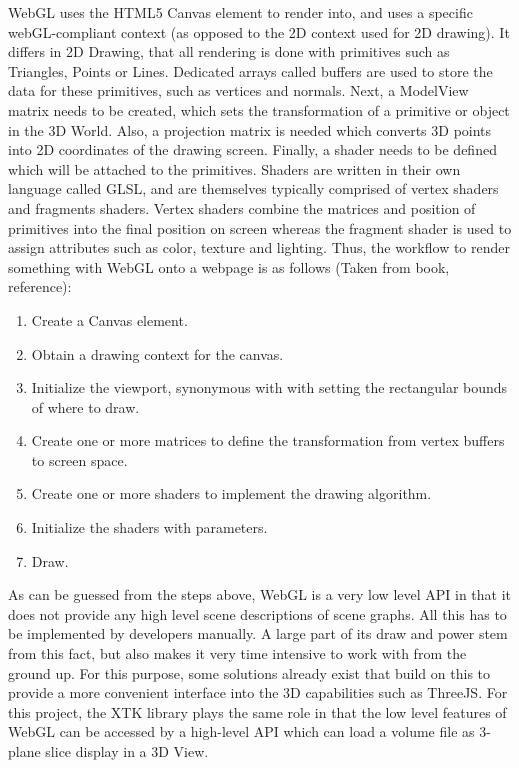 \documentclass[a4paper,11pt,twoside]{article}
\begin{document}
WebGL uses the HTML5 Canvas element to render into, and uses a specific webGL-compliant context (as opposed to the 2D context used for 2D drawing). It differs in 2D Drawing, that all rendering is done with primitives such as Triangles, Points or Lines. 
Dedicated arrays called buffers are used to store the data for these primitives, such as vertices and normals. Next, a ModelView matrix needs to be created, which sets the transformation of a primitive or object in the 3D World. Also, a projection matrix is needed which converts 3D points into 2D coordinates of the drawing screen. Finally, a shader needs to be defined which will be attached to the primitives. Shaders are written in their own language called GLSL, and are themselves typically comprised of vertex shaders and fragments shaders. Vertex shaders combine the matrices and position of primitives into the final position on screen whereas the fragment shader is used to assign attributes such as color, texture and lighting. Thus, the workflow to render something with WebGL onto a webpage is as follows (Taken from book, reference):

\begin{enumerate}
\item Create a Canvas element.
\item Obtain a drawing context for the canvas.
\item Initialize the viewport, synonymous with with setting the rectangular bounds of where to draw.
\item Create one or more matrices to define the transformation from vertex buffers to screen space.
\item Create one or more shaders to implement the drawing algorithm.
\item Initialize the shaders with parameters.
\item Draw.
\end{enumerate}


As can be guessed from the steps above, WebGL is a very low level API in that it does not provide any high level scene descriptions of scene graphs. All this has to be implemented by developers manually. A large part of its draw and power stem from this fact, but also makes it very time intensive to work with from the ground up. For this purpose, some solutions already exist that build on this to provide a more convenient interface into the 3D capabilities such as ThreeJS. For this project, the XTK library plays the same role in that the low level features of WebGL can be accessed by a high-level API which can load a volume file as 3-plane slice display in a 3D View.
\end{document}
